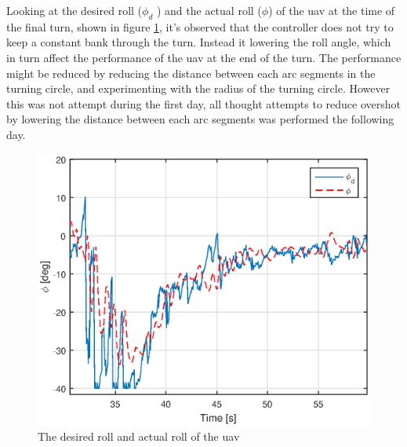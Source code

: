 Looking at the desired roll ($\phi_d$ ) and the actual roll ($\phi$) of the \gls{uav} at the time of the final turn, shown in figure \ref{Fig:DesiredRoll131844}, it's observed that the controller does not try to keep a constant bank through the turn. Instead it lowering the roll angle, which in turn affect the performance of the \gls{uav} at the end of the turn. The performance might be reduced by reducing the distance between each arc segments in the turning circle, and experimenting with the radius of the turning circle. However this was not attempt during the first day, all thought attempts to reduce overshot by lowering the distance between each arc segments was performed the following day.
\begin{figure}[H]
\centering
\includegraphics[scale=0.7]{figs/Experiment/rollDesired131844.eps}
\caption{The desired roll and actual roll of the \gls{uav}}
\label{Fig:DesiredRoll131844}
\end{figure}
